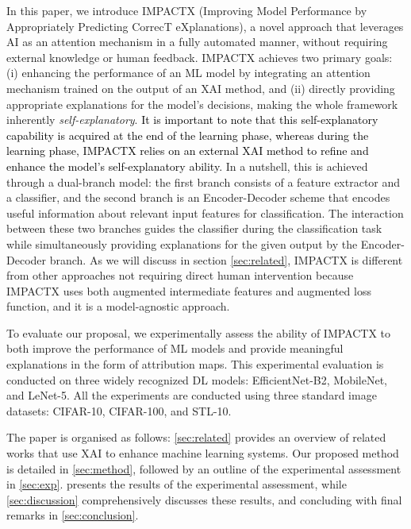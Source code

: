 In this paper, we introduce IMPACTX (Improving Model Performance by Appropriately Predicting CorrecT eXplanations), a novel approach that leverages AI as an attention mechanism in a fully automated manner, without requiring external knowledge or human feedback. IMPACTX achieves two primary goals: (i) enhancing the performance of an ML model by integrating an attention mechanism trained on the output of an XAI method, 
and  (ii) directly providing appropriate explanations for the model's decisions, making the whole framework inherently \textit{self-explanatory}. \textcolor{black}{
It is important to note that this self-explanatory capability is acquired at the end of the learning phase, whereas during the learning phase, IMPACTX relies on an external XAI method to refine and enhance the model's self-explanatory ability.}
In a nutshell, this is achieved through a dual-branch model: the first branch consists of a feature extractor and a classifier, and the second branch is an Encoder-Decoder scheme that encodes useful information about relevant input features for classification. The interaction between these two branches guides the classifier during the classification task while simultaneously providing explanations for the given output by the Encoder-Decoder branch.
As we will discuss in section \ref{sec:related}, IMPACTX is different from other approaches not requiring direct human intervention because IMPACTX uses both augmented intermediate features and augmented loss function, and it is a model-agnostic approach.

To evaluate our proposal, we experimentally assess the ability of IMPACTX to both improve the performance of ML models and provide meaningful explanations in the form of attribution maps. This experimental evaluation is conducted on three widely recognized DL models: EfficientNet-B2, MobileNet, and LeNet-5. All the experiments are conducted using  three standard image datasets: CIFAR-10, CIFAR-100, and STL-10. %

The paper is organised as follows: \cref{sec:related} provides an overview of related works that use XAI to enhance machine learning systems. Our proposed method is detailed in \cref{sec:method}, followed by an outline of the experimental assessment in \cref{sec:exp}.  presents the results of the experimental assessment, while \cref{sec:discussion} comprehensively discusses these results, and concluding with final remarks in \cref{sec:conclusion}.
